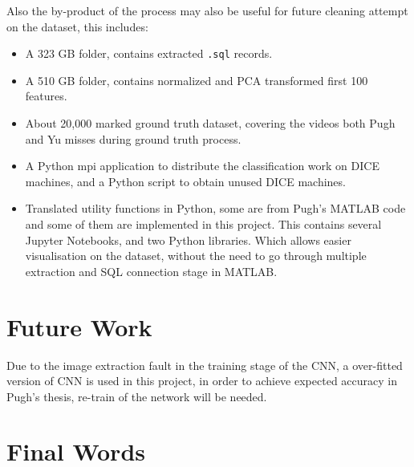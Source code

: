 \documentclass[bsc,logo,twoside,fullspacing,parskip]{infthesis}
\begin{document}
Also the by-product of the process may also be useful for future cleaning attempt on the dataset, this includes:
\begin{itemize}
\item A 323 GB folder, contains extracted {\tt .sql} records.
\item A 510 GB folder, contains normalized and PCA transformed first 100 features.
\item About 20,000 marked ground truth dataset, covering the videos both Pugh and Yu misses during ground truth process.
\item A Python mpi application to distribute the classification work on DICE machines, and a Python script to obtain unused DICE machines.
\item Translated utility functions in Python, some are from Pugh's MATLAB code and some of them are implemented in this project. This contains several Jupyter Notebooks, and two Python libraries. Which allows easier visualisation on the dataset, without the need to go through multiple extraction and SQL connection stage in MATLAB. 
\end{itemize}


\section{Future Work}
\label{sec:future}

Due to the image extraction fault in the training stage of the CNN, a over-fitted version of CNN is used in this project, in order to achieve expected accuracy in Pugh's thesis\cite{P1}, re-train of the network will be needed.



\section{Final Words}






\end{document}
